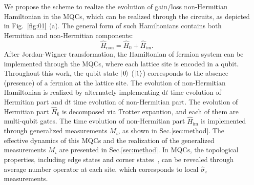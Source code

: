 \documentclass[longbibliography, aps, prx, amsmath, amssymb, amsfonts, twocolumn,superscriptaddress, footinbib]{revtex4-1}
\begin{document}
	We propose the scheme to realize the evolution of gain/loss non-Hermitian Hamiltonian in the MQCs, which can be realized through the circuits, as depicted in Fig.~\ref{fig:01} (a).
	The general form of such Hamiltonians contains both Hermitian and non-Hermitian components:
	\begin{equation}
		\hat{H}_{\text{non}} = \hat{H}_0 +\hat{H}_{\text{im}}. \label{eq:non-hermitian}
	\end{equation}
	After Jordan-Wigner transformation, the Hamiltonian of fermion system can be implemented through the MQCs, where each lattice site is encoded in a qubit. Throughout this work, the qubit state $\ket{0}$ ($\ket{1}$) corresponds to the absence (presence) of a fermion at the lattice site.
	The evolution of non-Hermitian Hamiltonian is realized by alternately implementing $\mathrm{d} t$ time evolution of Hermitian part and $\mathrm{d} t$ time evolution of non-Hermitian part. 
	The evolution of Hermitian part $\hat{H}_0$ is decomposed via Trotter expantion, and each of them are multi-qubit gates. 
	The time evolution of non-Hermitian part $\hat{H}_{\text{im}}$ is implemented through generalized measurements $M_i$, as shown in Sec.\ref{sec:method}.
	The effective dynamics of this MQCs and the realization of the generalized measurements $M_i$ are presented in Sec.\ref{sec:method}.
	In MQCs, the topological properties, including edge states and corner states~\cite{zou2021observation,shen2025observation}, can be revealed through average number operator at each site, which corresponds to local $\hat{\sigma}_z$ measurements.
\end{document}
